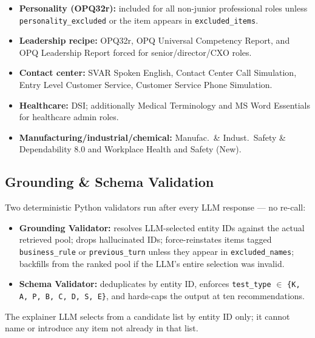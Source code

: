 \documentclass[10pt,twocolumn,letterpaper]{article}
\begin{document}
\begin{itemize}

\item \textbf{Personality (OPQ32r):} included for all
non-junior professional roles unless \texttt{personality\_excluded} or
the item appears in \texttt{excluded\_items}.

\item \textbf{Leadership recipe:} OPQ32r, OPQ Universal Competency
Report, and OPQ Leadership Report forced for senior/director/CXO roles.

\item \textbf{Contact center:} SVAR Spoken English, Contact Center Call
Simulation, Entry Level Customer Service, Customer Service Phone
Simulation.

\item \textbf{Healthcare:} DSI; additionally Medical Terminology and
MS Word Essentials for healthcare admin roles.

\item \textbf{Manufacturing/industrial/chemical:}
Manufac.\ \& Indust.\ Safety \& Dependability 8.0 and Workplace Health
and Safety (New).

\end{itemize}

\subsection{Grounding \& Schema Validation}

Two deterministic Python validators run after every LLM response
--- no re-call:

\begin{itemize}

\item \textbf{Grounding Validator:} resolves LLM-selected entity IDs
against the actual retrieved pool; drops hallucinated IDs;
force-reinstates items tagged \texttt{business\_rule} or
\texttt{previous\_turn} unless they appear in \texttt{excluded\_names};
backfills from the ranked pool if the LLM's entire selection was
invalid.

\item \textbf{Schema Validator:} deduplicates by entity ID, enforces
\texttt{test\_type} $\in$ \texttt{\{K, A, P, B, C, D, S, E\}}, and
hards-caps the output at ten recommendations.

\end{itemize}

The explainer LLM selects from a candidate list by entity ID only;
it cannot name or introduce any item not already in that list.
\end{document}
